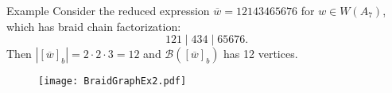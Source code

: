 \documentclass[final]{beamer}
\newcommand{\w}{\overline{w}}
\begin{document}
\begin{frame}{}
\begin{columns}[T]
\begin{column}{.33\linewidth}
\begin{block}{Example}
Consider the reduced expression $\w = 12143465676$ for $w \in W(A_7)$, which has braid chain factorization:
\[
121 \mid 434 \mid 65676.
\]
Then $|[\w]_b|=2\cdot 2\cdot 3 = 12$ and $\mathcal{B}([\w]_b)$ has 12 vertices.

\begin{figure}
\texttt{[image: BraidGraphEx2.pdf]}
%
%
%
%
%
%
%
%
%
%
%
%
%
%
%
%
\end{figure}
\vspace{-.03em}
\end{block}



\end{column}
\end{columns}
\end{frame}
\end{document}
